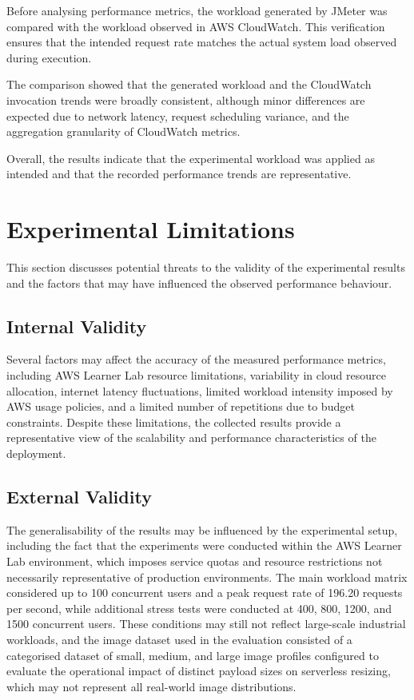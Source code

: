 \documentclass[11pt,a4paper,twocolumn]{article}
\begin{document}
Before analysing performance metrics, the workload generated by JMeter was compared with the workload observed in AWS CloudWatch. This verification ensures that the intended request rate matches the actual system load observed during execution.

The comparison showed that the generated workload and the CloudWatch invocation trends were broadly consistent, although minor differences are expected due to network latency, request scheduling variance, and the aggregation granularity of CloudWatch metrics.

Overall, the results indicate that the experimental workload was applied as intended and that the recorded performance trends are representative.


\section{Experimental Limitations}

This section discusses potential threats to the validity of the experimental results and the factors that may have 
influenced the observed performance behaviour.

\subsection{Internal Validity}

Several factors may affect the accuracy of the measured performance metrics, including AWS Learner Lab resource limitations, variability in cloud resource allocation, internet latency fluctuations, limited workload intensity imposed by AWS usage policies, and a limited number of repetitions due to budget constraints. Despite these limitations, the collected results provide a representative view of the scalability and performance characteristics of the deployment.

\subsection{External Validity}


The generalisability of the results may be influenced by the experimental setup, including the fact that the experiments were conducted within the AWS Learner Lab environment, which imposes service quotas and resource restrictions not necessarily representative of production environments. The main workload matrix considered up to 100 concurrent users and a peak request rate of 196.20 requests per second, while additional stress tests were conducted at 400, 800, 1200, and 1500 concurrent users. These conditions may still not reflect large-scale industrial workloads, and the image dataset used in the evaluation consisted of a categorised dataset of small, medium, and large image profiles configured to evaluate the operational impact of distinct payload sizes on serverless resizing, which may not represent all real-world image distributions.
\end{document}

